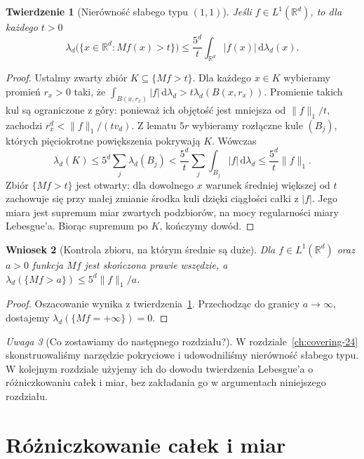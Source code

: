 \documentclass[11pt,a4paper,oneside]{book}
\numberwithin{equation}{chapter}
\theoremstyle{plain}
\newtheorem{twierdzenie}{Twierdzenie}[chapter]
\newtheorem{wniosek}[twierdzenie]{Wniosek}
\theoremstyle{definition}
\theoremstyle{remark}
\newtheorem{uwaga}[twierdzenie]{Uwaga}
\begin{document}
\begin{twierdzenie}[Nierówność słabego typu $(1,1)$]
\label{thm:HL-weak-24}
Jeśli $f\in L^1(\mathbb R^d)$, to dla każdego $t>0$
\[
 \lambda_d\bigl(\{x\in\mathbb R^d:Mf(x)>t\}\bigr)
 \le\frac{5^d}{t}\int_{\mathbb R^d}|f(x)|\,
 \mathrm d\lambda_d(x).
\]
\end{twierdzenie}
\begin{proof}
Ustalmy zwarty zbiór $K\subseteq\{Mf>t\}$.
Dla każdego $x\in K$ wybieramy promień $r_x>0$ taki,
że $\int_{B(x,r_x)}|f|\,\mathrm d\lambda_d>
 t\lambda_d(B(x,r_x))$. Promienie takich kul są
ograniczone z góry: ponieważ ich objętość jest mniejsza
od $\|f\|_1/t$, zachodzi $r_x^d<\|f\|_1/(tv_d)$.
Z lematu $5r$ wybieramy rozłączne kule $(B_j)$, których
pięciokrotne powiększenia pokrywają $K$. Wówczas
\[
 \lambda_d(K)\le5^d\sum_j\lambda_d(B_j)
 <\frac{5^d}{t}\sum_j\int_{B_j}|f|\,\mathrm d\lambda_d
 \le\frac{5^d}{t}\|f\|_1.
\]
Zbiór $\{Mf>t\}$ jest otwarty: dla dowolnego $x$
warunek średniej większej od $t$ zachowuje się przy małej
zmianie środka kuli dzięki ciągłości całki z $|f|$.
Jego miara jest supremum miar zwartych podzbiorów,
na mocy regularności miary Lebesgue'a. Biorąc supremum
po $K$, kończymy dowód.
\end{proof}

\begin{wniosek}[Kontrola zbioru, na którym średnie są duże]
\label{cor:HL-level-24}
Dla $f\in L^1(\mathbb R^d)$ oraz $a>0$ funkcja $Mf$
jest skończona prawie wszędzie, a
$\lambda_d(\{Mf>a\})\le5^d\|f\|_1/a$.
\end{wniosek}
\begin{proof}
Oszacowanie wynika z twierdzenia~\ref{thm:HL-weak-24}.
Przechodząc do granicy $a\to\infty$, dostajemy
$\lambda_d(\{Mf=+\infty\})=0$.
\end{proof}

\begin{uwaga}[Co zostawiamy do następnego rozdziału?]
W rozdziale~\ref{ch:covering-24} skonstruowaliśmy narzędzie
pokryciowe i udowodniliśmy nierówność słabego typu.
W kolejnym rozdziale użyjemy ich do dowodu twierdzenia
Lebesgue'a o różniczkowaniu całek i miar, bez zakładania
go w argumentach niniejszego rozdziału.
\end{uwaga}



\chapter{Różniczkowanie całek i miar}
\label{ch:differentiation-25}
\end{document}
